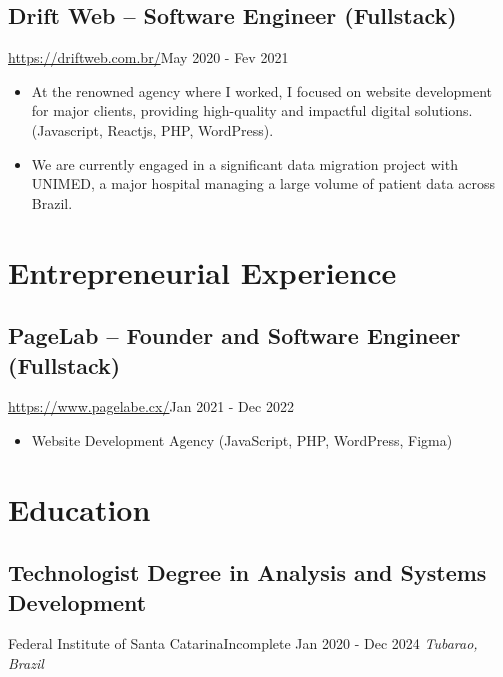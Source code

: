 \documentclass[11pt, a4paper]{article}
\begin{document}
\subsection*{Drift Web -- Software Engineer (Fullstack)}
\href{https://driftweb.com.br/}{https://driftweb.com.br/}\hfill May 2020 - Fev 2021
\begin{itemize}[noitemsep]
    \item At the renowned agency where I worked, I focused on website development for major clients, providing high-quality and impactful digital solutions.(Javascript, Reactjs, PHP, WordPress).
    \item We are currently engaged in a significant data migration project with UNIMED, a major hospital managing a large volume of patient data across Brazil.
\end{itemize}

\section*{Entrepreneurial Experience}
\subsection*{PageLab -- Founder and Software Engineer (Fullstack)}
\href{https://www.pagelabe.cx/}{https://www.pagelabe.cx/}\hfill Jan 2021 - Dec 2022
\begin{itemize}[noitemsep]
  \item Website Development Agency (JavaScript, PHP, WordPress, Figma)
\end{itemize}

\section*{Education}
\subsection*{Technologist Degree in Analysis and Systems Development}
Federal Institute of Santa Catarina\hfill Incomplete \hfill Jan 2020 - Dec 2024
\textit{Tubarao, Brazil}
\end{document}
